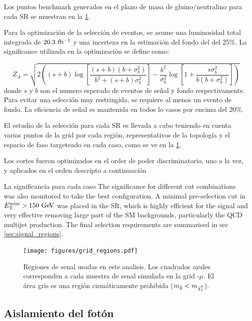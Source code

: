 Los puntos benchmark generados en el plano de masa de gluino/neutralino para cada SR se muestran en la
{\fig} \ref{fig:SRegions}.

Para la optimización de la selección de eventos, se asume una luminosidad total integrada de
$20.3~\mbox{fb$^{-1}$}$ y una incerteza en la estimación del fondo del {\SM} del 25\%. La significance
utilizada en la optimización se define como:

\begin{equation*}
  Z_A = \sqrt{2 \left( (s + b) \log\left[\frac{(s + b) (b + \sigma_b^2)}{b^2 + (s + b) \sigma_b^2}\right] - \frac{b^2}{\sigma_b^2} \log\left[1 + \frac{s \sigma_b^2}{b (b + \sigma_b^2)}\right] \right)}
\end{equation*}
%
donde $s$ y $b$ son el numero esperado de eventos de señal y fondo respectivamente. Para evitar
una selección muy restringida, se requiere al menos un evento de fondo. La eficiencia de señal
es mantenida en todos lo casos por encima del 20\%.

El estudio de la selección para cada SR es llevada a cabo teniendo en cuenta
varios puntos de la grid por cada región, representativos de la topología y el
espacio de faso targeteado en cada caso, como se ve en la  {\fig} \ref{fig:SRegions}.

Los cortes fueron optimizados en el order de poder discriminatorio, uno a la vez, y aplicados
en el orden descripto a continuación

La significancia para cada caso
The significance for different cut combinations was also monitored to take the best configuration.
A minimal pre-selection cut in $\met>150\gev$ was placed in the SR, which is highly efficient for the signal and very effective
removing large part of the SM backgrounds, particularly the QCD multijet production. The final selection requirements are summarised in sec \ref{sec:signal_regions}.

\begin{figure}[h!]
  \centering
  \texttt{[image: figures/grid\_regions.pdf]}
  \caption{Regiones de senal usadas en este analisis.
    Los cuadrados azules corresponden a cada muestra de senal simulada en la
    grid -$\mu$.
    El área gris es una región cismáticamente prohibida ($m_{\gluino}<m_{\ninoone}$).}\label{fig:SRegions}
\end{figure}

\subsection{Aislamiento del fotón}\label{sec:opt_ph_iso}


